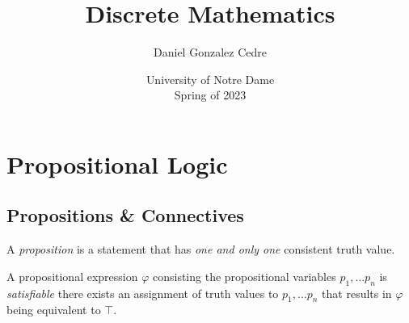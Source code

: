 







\title{Discrete Mathematics}
\author{Daniel Gonzalez Cedre}
\date{University of Notre Dame \\ Spring of 2023}
\maketitle

\setcounter{chapter}{0}
\chapter{Propositional Logic}\label{chap:propositional}

\section{Propositions \& Connectives}

\begin{definition}[Proposition]
    A \emph{proposition} is a statement
    that has \emph{one and only one} consistent truth value.
\end{definition}

\begin{definition}[Satisfiability]
    A propositional expression $\varphi$ consisting the propositional variables $p_1, \dots p_n$ is \emph{satisfiable}
    \iffbydefn there exists an assignment of truth values to $p_1, \dots p_n$ that results in $\varphi$ being equivalent to $\top$.
\end{definition}


